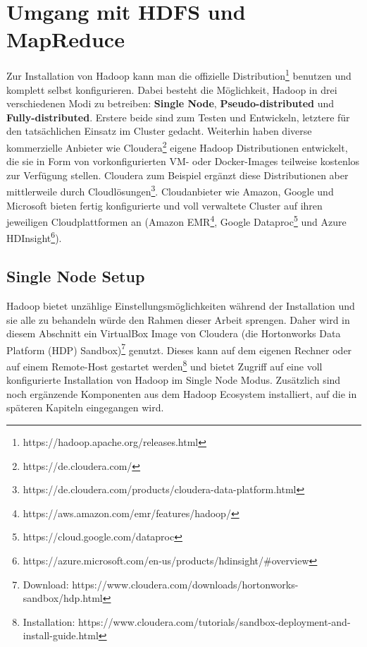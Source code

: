 \chapter{Umgang mit HDFS und MapReduce}
Zur Installation von Hadoop kann man die offizielle Distribution\footnote{https://hadoop.apache.org/releases.html} benutzen und komplett selbst konfigurieren. Dabei besteht die Möglichkeit, Hadoop in drei verschiedenen Modi zu betreiben: \textbf{Single Node}, \textbf{Pseudo-distributed} und \textbf{Fully-distributed}. Erstere beide sind zum Testen und Entwickeln, letztere für den tatsächlichen Einsatz im Cluster gedacht\cite[vgl.][Kap. 3.4]{freiknecht_big_2018}.
Weiterhin haben diverse kommerzielle Anbieter wie Cloudera\footnote{https://de.cloudera.com/} eigene Hadoop Distributionen entwickelt, die sie in Form von vorkonfigurierten VM- oder Docker-Images teilweise kostenlos zur Verfügung stellen. Cloudera zum Beispiel ergänzt diese Distributionen aber mittlerweile durch Cloudlösungen\footnote{https://de.cloudera.com/products/cloudera-data-platform.html}.   
Cloudanbieter wie Amazon, Google und Microsoft bieten fertig konfigurierte und voll verwaltete Cluster auf ihren jeweiligen Cloudplattformen an (Amazon EMR\footnote{https://aws.amazon.com/emr/features/hadoop/}, Google Dataproc\footnote{https://cloud.google.com/dataproc} und Azure HDInsight\footnote{https://azure.microsoft.com/en-us/products/hdinsight/\#overview}). 

\section{Single Node Setup}
Hadoop bietet unzählige Einstellungsmöglichkeiten während der Installation und sie alle zu behandeln würde den Rahmen dieser Arbeit sprengen. Daher wird in diesem Abschnitt ein VirtualBox Image von Cloudera (die Hortonworks Data Platform (HDP) Sandbox)\footnote{Download: https://www.cloudera.com/downloads/hortonworks-sandbox/hdp.html} genutzt. Dieses kann auf dem eigenen Rechner oder auf einem Remote-Host gestartet werden\footnote{Installation: https://www.cloudera.com/tutorials/sandbox-deployment-and-install-guide.html} und bietet Zugriff auf eine voll konfigurierte Installation von Hadoop im Single Node Modus. Zusätzlich sind noch ergänzende Komponenten aus dem Hadoop Ecosystem installiert, auf die in späteren Kapiteln eingegangen wird.

